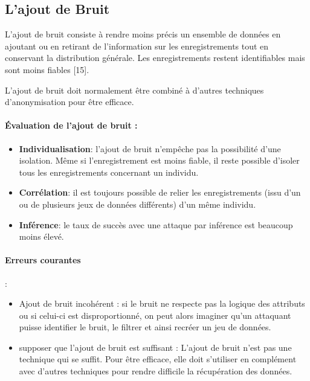 \subsection{L’ajout de Bruit} 

L’ajout de bruit consiste à rendre moins précis un ensemble de données en ajoutant ou en retirant de l’information sur les enregistrements tout en conservant la distribution générale. Les enregistrements restent identifiables mais sont moins fiables [15]. 

L’ajout de bruit doit normalement être combiné à d’autres techniques d’anonymisation pour être efficace\cite{noauthor_repertoire_2018-1}.  

\paragraph{Évaluation de l’ajout de bruit : }

\begin{itemize}
    \item  \textbf{Individualisation}: l’ajout de bruit n’empêche pas la possibilité d’une isolation. Même si l’enregistrement est moins fiable, il reste possible d’isoler tous les enregistrements concernant un individu. 
    
    \item  \textbf{Corrélation}: il est toujours possible de relier les enregistrements (issu d’un ou de plusieurs jeux de données différents) d’un même individu. 
    
    \item \textbf{Inférence}: le taux de succès avec une attaque par inférence est beaucoup moins élevé. 
\end{itemize}

\paragraph{Erreurs courantes}:   
\begin{itemize}
    \item Ajout de bruit incohérent : si le bruit ne respecte pas la logique des attributs ou si celui-ci est disproportionné, on peut alors imaginer qu'un attaquant puisse identifier le bruit, le filtrer et ainsi recréer un jeu de données. 
    \item supposer que l’ajout de bruit est suffisant : L'ajout de bruit n'est pas une technique qui se suffit. Pour être efficace, elle doit s'utiliser en complément avec d'autres techniques pour rendre difficile la récupération des données.
\end{itemize}

